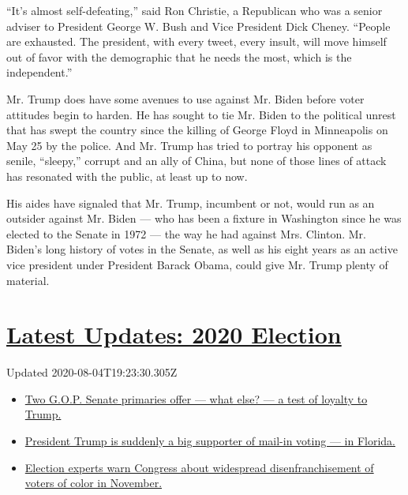 ``It's almost self-defeating,'' said Ron Christie, a Republican who was
a senior adviser to President George W. Bush and Vice President Dick
Cheney. ``People are exhausted. The president, with every tweet, every
insult, will move himself out of favor with the demographic that he
needs the most, which is the independent.''

Mr. Trump does have some avenues to use against Mr. Biden before voter
attitudes begin to harden. He has sought to tie Mr. Biden to the
political unrest that has swept the country since the killing of George
Floyd in Minneapolis on May 25 by the police. And Mr. Trump has tried to
portray his opponent as senile, ``sleepy,'' corrupt and an ally of
China, but none of those lines of attack has resonated with the public,
at least up to now.

His aides have signaled that Mr. Trump, incumbent or not, would run as
an outsider against Mr. Biden --- who has been a fixture in Washington
since he was elected to the Senate in 1972 --- the way he had against
Mrs. Clinton. Mr. Biden's long history of votes in the Senate, as well
as his eight years as an active vice president under President Barack
Obama, could give Mr. Trump plenty of material.

\hypertarget{latest-updates-2020-election}{%
\section{\texorpdfstring{\href{https://www.nytimes.com/2020/08/04/us/elections/primary-election-michigan-arizona-kansas.html?action=click\&pgtype=Article\&state=default\&region=MAIN_CONTENT_1\&context=storylines_live_updates}{Latest
Updates: 2020
Election}}{Latest Updates: 2020 Election}}\label{latest-updates-2020-election}}

Updated 2020-08-04T19:23:30.305Z

\begin{itemize}
\tightlist
\item
  \href{https://www.nytimes.com/2020/08/04/us/elections/primary-election-michigan-arizona-kansas.html?action=click\&pgtype=Article\&state=default\&region=MAIN_CONTENT_1\&context=storylines_live_updates\#link-3924dd44}{Two
  G.O.P. Senate primaries offer --- what else? --- a test of loyalty to
  Trump.}
\item
  \href{https://www.nytimes.com/2020/08/04/us/elections/primary-election-michigan-arizona-kansas.html?action=click\&pgtype=Article\&state=default\&region=MAIN_CONTENT_1\&context=storylines_live_updates\#link-32b39e33}{President
  Trump is suddenly a big supporter of mail-in voting --- in Florida.}
\item
  \href{https://www.nytimes.com/2020/08/04/us/elections/primary-election-michigan-arizona-kansas.html?action=click\&pgtype=Article\&state=default\&region=MAIN_CONTENT_1\&context=storylines_live_updates\#link-6d019753}{Election
  experts warn Congress about widespread disenfranchisement of voters of
  color in November.}
\end{itemize}

